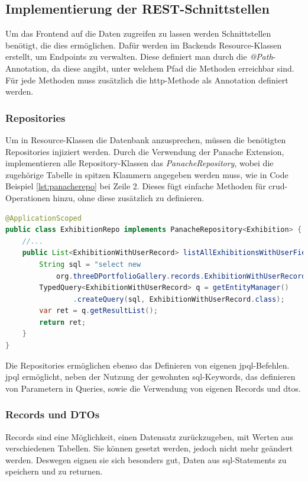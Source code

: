 \subsection{Implementierung der REST-Schnittstellen}

Um das Frontend auf die Daten zugreifen zu lassen werden Schnittstellen benötigt, die dies ermöglichen. 
Dafür werden im Backends Resource-Klassen erstellt, um Endpoints zu verwalten. 
Diese definiert man durch die \emph{@Path}-Annotation, da diese angibt, unter welchem Pfad die Methoden erreichbar sind. 
Für jede Methoden muss zusätzlich die \gls{http}-Methode als Annotation definiert werden. 

\subsubsection{Repositories} 
Um in Resource-Klassen die Datenbank anzusprechen, müssen die benötigten Repositories injiziert werden. 
Durch die Verwendung der Panache Extension, implementieren alle Repository-Klassen das \emph{PanacheRepository}, wobei die zugehörige Tabelle in spitzen Klammern angegeben werden muss, wie in Code Beispiel \ref{lst:panacherepo} bei Zeile 2.
Dieses fügt einfache Methoden für \gls{crud}-Operationen hinzu, ohne diese zusätzlich zu definieren. 

\begin{lstlisting}[label=lst:panacherepo, language=Java, caption=Teil aus dem Exhibition Repository]
@ApplicationScoped
public class ExhibitionRepo implements PanacheRepository<Exhibition> {
    //...
    public List<ExhibitionWithUserRecord> listAllExhibitionsWithUserField() {
        String sql = "select new 
            org.threeDPortfolioGallery.records.ExhibitionWithUserRecord(e, u.user_name, u.icon_url) from Exhibition e join e.user u left join e.categories c";
        TypedQuery<ExhibitionWithUserRecord> q = getEntityManager()
                .createQuery(sql, ExhibitionWithUserRecord.class);
        var ret = q.getResultList();
        return ret;
    }
}
\end{lstlisting}

Die Repositories ermöglichen ebenso das Definieren von eigenen \gls{jpql}-Befehlen. 
\gls{jpql} ermöglicht, neben der Nutzung der gewohnten \gls{sql}-Keywords, das definieren von Parametern in Queries, sowie die Verwendung von eigenen Records und \gls{dto}s.

\subsubsection{Records und DTOs}
Records sind eine Möglichkeit, einen Datensatz zurückzugeben, mit Werten aus verschiedenen Tabellen. 
Sie können gesetzt werden, jedoch nicht mehr geändert werden. 
Deswegen eignen sie sich besonders gut, Daten aus \gls{sql}-Statements zu speichern und zu returnen.

